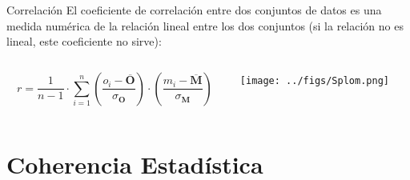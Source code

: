 \documentclass[aspectratio=169, usenames,svgnames,dvipsnames]{beamer}
\begin{document}
\begin{frame}[label={sec:org08c60d9}]{Correlación}
El coeficiente de correlación entre dos conjuntos de datos es una
medida numérica de la relación \alert{lineal} entre los dos conjuntos (si la
relación no es lineal, este coeficiente no sirve):

\begin{columns}
\begin{column}{0.5\columnwidth}
\[
r = \frac{1}{n-1} \cdot \sum_{i=1}^{n} \left( \frac{o_{i}-\overline{\mathbf{O}}}{\sigma_{\mathbf{O}}}\right) \cdot \left(\frac{m_{i}-\overline{\mathbf{M}}}{\sigma_{\mathbf{M}}}\right)
\]
\end{column}

\begin{column}{0.5\columnwidth}
\begin{center}
\texttt{[image: ../figs/Splom.png]}
\end{center}
\end{column}
\end{columns}
\end{frame}


\section{Coherencia Estadística}
\label{sec:org4378f75}
\end{document}
